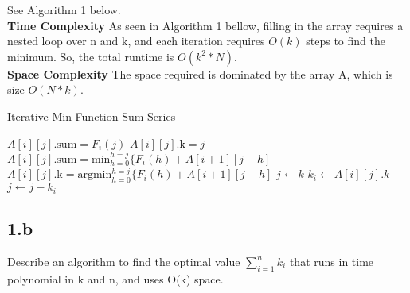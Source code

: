 \documentclass[11pt]{article}
\begin{document}
\begin{solution}
See Algorithm 1 below. \\

\textbf{Time Complexity}
As seen in Algorithm 1 bellow, filling in the array requires a nested loop over n and k, and each iteration requires $O(k)$ steps to find the minimum. So, the total runtime is $O(k^2*N)$. \\
\textbf{Space Complexity}
The space required is dominated by the array A, which is size $O(N*k)$.
\begin{algorithm}
\caption{Iterative Min Function Sum Series}
\begin{algorithmic}
\STATE $A[i][j].\text{sum} = F_i(j)$
\STATE $A[i][j].\text{k} = j$
\ELSE
\STATE $A[i][j].\text{sum} = \text{min}_{h=0}^{h=j} \{ F_i(h) + A[i+1][j-h]$
\STATE $A[i][j].\text{k} = \text{argmin}_{h=0}^{h=j} \{ F_i(h) + A[i+1][j-h]$
\ENDIF
\ENDFOR
\ENDFOR
\STATE $j \gets k$
\STATE $k_i \gets A[i][j].k$
\STATE $j \gets j - k_i$
\ENDFOR
\end{algorithmic}
\end{algorithm} 
\end{solution}

\clearpage



\subsection *{1.b} Describe an algorithm to find the optimal value $\sum_{i=1}^{n} k_i$ that runs in time polynomial in k and n, and uses O(k) space. 
\end{document}
